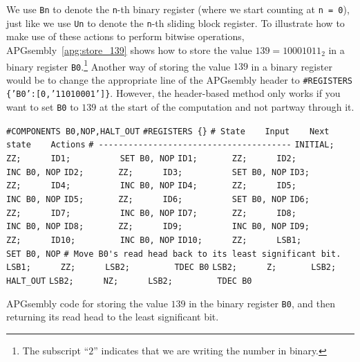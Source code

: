 We use \texttt{Bn} to denote the \texttt{n}-th binary register (where we start counting at \texttt{n = 0}), just like we use \texttt{Un} to denote the \texttt{n}-th sliding block register. To illustrate how to make use of these actions to perform bitwise operations, APGsembly~\ref{apg:store_139} shows how to store the value $139 = 10001011_2$ in a binary register \texttt{B0}.\footnote{The subscript ``$2$'' indicates that we are writing the number in binary.} Another way of storing the value $139$ in a binary register would be to change the appropriate line of the APGsembly header to \texttt{\#REGISTERS \{'B0':[0,'11010001']\}}. However, the header-based method only works if you want to set \texttt{B0} to $139$ at the start of the computation and not partway through it.

\begin{apgsembly}
	\begin{algorithmic}\small
		\State \verb|#COMPONENTS B0,NOP,HALT_OUT|
		\State \verb|#REGISTERS {}|
		\State \verb|# State    Input    Next state    Actions|
		\State \verb|# ---------------------------------------|
		\State \verb|INITIAL;   ZZ;      ID1;          SET B0, NOP|
		\State \verb|ID1;       ZZ;      ID2;          INC B0, NOP|
		\State \verb|ID2;       ZZ;      ID3;          SET B0, NOP|
		\State \verb|ID3;       ZZ;      ID4;          INC B0, NOP|
		\State \verb|ID4;       ZZ;      ID5;          INC B0, NOP|
		\State \verb|ID5;       ZZ;      ID6;          SET B0, NOP|
		\State \verb|ID6;       ZZ;      ID7;          INC B0, NOP|
		\State \verb|ID7;       ZZ;      ID8;          INC B0, NOP|
		\State \verb|ID8;       ZZ;      ID9;          INC B0, NOP|
		\State \verb|ID9;       ZZ;      ID10;         INC B0, NOP|
		\State \verb|ID10;      ZZ;      LSB1;         SET B0, NOP|
		\State
		\State \verb|# Move B0's read head back to its least significant bit.|
		\State \verb|LSB1;      ZZ;      LSB2;         TDEC B0|
		\State \verb|LSB2;      Z;       LSB2;         HALT_OUT|
		\State \verb|LSB2;      NZ;      LSB2;         TDEC B0|
	\end{algorithmic}
	\caption{APGsembly code for storing the value $139$ in the binary register \texttt{B0}, and then returning its read head to the least significant bit.}\label{apg:store_139}
\end{apgsembly}

